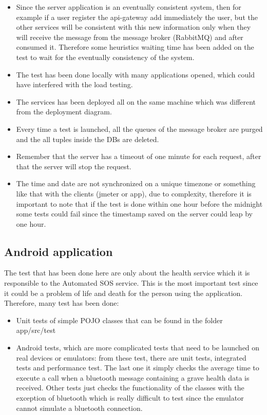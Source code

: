 \begin{itemize}
\item Since the server application is an eventually consistent system, then for example if a user register the api-gateway add immediately the user, but the other services will be consistent with this new information only when they will receive the message from the message broker (RabbitMQ) and after consumed it. Therefore some heuristics waiting time has been added on the test to wait for the eventually consistency of the system.
\item The test has been done locally with many applications opened, which could have interfered with the load testing.
\item The services has been deployed all on the same machine which was different from the deployment diagram.
\item Every time a test is launched, all the queues of the message broker are purged and the all tuples inside the DBs are deleted.
\item Remember that the server has a timeout of one minute for each request, after that the server will stop the request.
\item The time and date are not synchronized on a unique timezone or something like that with the clients (jmeter or app), due to complexity, therefore it is important to note that if the test is done within one hour before the midnight some tests could fail since the timestamp saved on the server could leap by one hour.
\end{itemize}


\subsection{Android application}
The test that has been done here are only about the health service which it is responsible to the Automated SOS service. This is the most important test since it could be a problem of life and death for the person using the application. Therefore, many test has been done:
\begin{itemize}
\item Unit tests of simple POJO classes that can be found in the folder app/src/test
\item Android tests, which are more complicated tests that need to be launched on real devices or emulators: from these test, there are unit tests, integrated tests and performance test. The last one it simply checks the average time to execute a call when a bluetooth message containing a grave health data is received. Other tests just checks the functionality of the classes with the exception of 
bluetooth which is really difficult to test since the emulator cannot simulate a bluetooth connection.
\\\\
\end{itemize}

